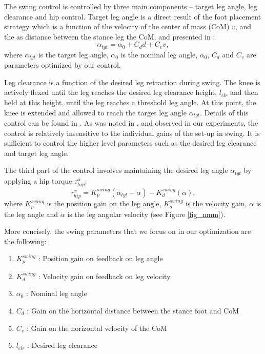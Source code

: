 The swing control is controlled by three main components -- target leg angle, leg clearance and hip control. Target leg angle is a direct result of the foot placement strategy which is a function of the velocity of the center of mass (CoM) $v$, and the as distance between the stance leg the CoM, and presented in \cite{simbicon}:
\begin{equation*}
\alpha_{tgt} = \alpha_0 + C_d d + C_v v,
\end{equation*}
where $\alpha_{tgt}$ is the target leg angle, $\alpha_0$ is the nominal leg angle, $\alpha_0$, $C_d$ and $C_v$ are parameters optimized by our control.

Leg clearance is a function of the desired leg retraction during swing. The knee is actively flexed until the leg reaches the desired leg clearance height, $l_{clr}$ and then held at this height, until the leg reaches a threshold leg angle. At this point, the knee is extended and allowed to reach the target leg angle $\alpha_{tgt}$. Details of this control can be found in \cite{desai}. As was noted in \cite{song2015neural}, and observed in our experiments, the control is relatively insensitive to the individual gains of the set-up in swing. It is sufficient to control the higher level parameters such as the desired leg clearance and target leg angle.

The third part of the control involves maintaining the desired leg angle $\alpha_{tgt}$ by applying a hip torque $\tau_{hip}^{\alpha}$:
\begin{equation*}
\tau_{hip}^{\alpha} = K_p^{swing}(\alpha_{tgt} - \alpha) - K_d^{swing}(\dot{\alpha}),
\end{equation*}
where $K_p^{swing}$ is the position gain on the leg angle, $K_d^{swing}$ is the velocity gain, $\alpha$ is the leg angle and $\dot{\alpha}$ is the leg angular velocity (see Figure \ref{fig_nmm}). 

More concisely, the swing parameters that we focus on in our optimization are the following:
\begin{enumerate}
\item $K_p^{swing}$ : Position gain on feedback on leg angle
\vspace{-2mm}
\item $K_d^{swing}$ : Velocity gain on feedback on leg velocity
\vspace{-2mm}
\item $\alpha_0$ : Nominal leg angle
\vspace{-2mm}
\item $C_d$ : Gain on the horizontal distance between the stance foot and CoM
\vspace{-2mm}
\item $C_v$ : Gain on the horizontal velocity of the CoM
\vspace{-2mm}
\item $l_{clr}$ : Desired leg clearance
\end{enumerate}

